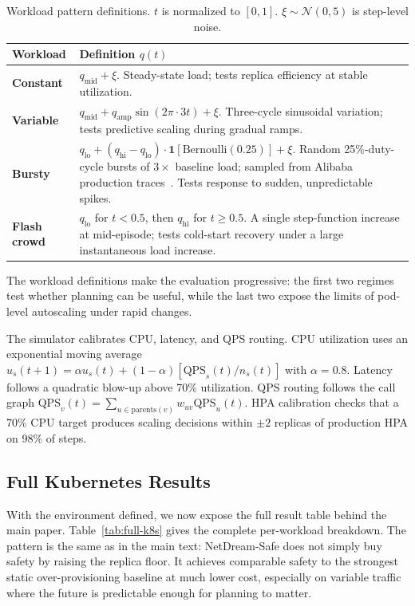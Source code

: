 \begin{table}[H]
\centering
\small
\caption{Workload pattern definitions. $t$ is normalized to $[0,1]$.
$\xi \sim \mathcal{N}(0, 5)$ is step-level noise.}
\label{tab:workloads}
\begin{tabular}{@{}lp{8cm}@{}}
\toprule
Workload & Definition $q(t)$ \\
\midrule
\textbf{Constant} &
  $q_{\text{mid}} + \xi$.
  Steady-state load; tests replica efficiency at stable utilization. \\
\textbf{Variable} &
  $q_{\text{mid}} + q_{\text{amp}} \sin(2\pi \cdot 3t) + \xi$.
  Three-cycle sinusoidal variation; tests predictive scaling during
  gradual ramps. \\
\textbf{Bursty} &
  $q_{\text{lo}} + (q_{\text{hi}} - q_{\text{lo}}) \cdot
  \mathbf{1}[\text{Bernoulli}(0.25)] + \xi$.
  Random 25\%-duty-cycle bursts of $3\!\times$ baseline load;
  sampled from Alibaba production traces~\citep{alibabatrace2022}.
  Tests response to sudden, unpredictable spikes. \\
\textbf{Flash crowd} &
  $q_{\text{lo}}$ for $t < 0.5$, then $q_{\text{hi}}$ for $t \geq 0.5$.
  A single step-function increase at mid-episode; tests cold-start
  recovery under a large instantaneous load increase. \\
\bottomrule
\end{tabular}
\end{table}

The workload definitions make the evaluation progressive: the first two
regimes test whether planning can be useful, while the last two expose
the limits of pod-level autoscaling under rapid changes.

The simulator calibrates CPU, latency, and QPS routing.  CPU utilization
uses an exponential moving average
$u_s(t+1)=\alpha u_s(t)+(1-\alpha)[\text{QPS}_s(t)/n_s(t)]$ with
$\alpha=0.8$.  Latency follows a quadratic blow-up above 70\%
utilization.  QPS routing follows the call graph
$\text{QPS}_v(t)=\sum_{u\in\mathrm{parents}(v)} w_{uv}\text{QPS}_u(t)$.
HPA calibration checks that a 70\% CPU target produces scaling decisions
within $\pm2$ replicas of production HPA on 98\% of steps.

\subsection{Full Kubernetes Results}
\label{app:extended}

With the environment defined, we now expose the full result table behind
the main paper.  Table~\ref{tab:full-k8s} gives the complete per-workload
breakdown.  The pattern is the same as in the main text:
NetDream-Safe does not simply buy safety by raising the replica floor.
It achieves comparable safety to the strongest static over-provisioning
baseline at much lower cost, especially on variable traffic where the
future is predictable enough for planning to matter.

